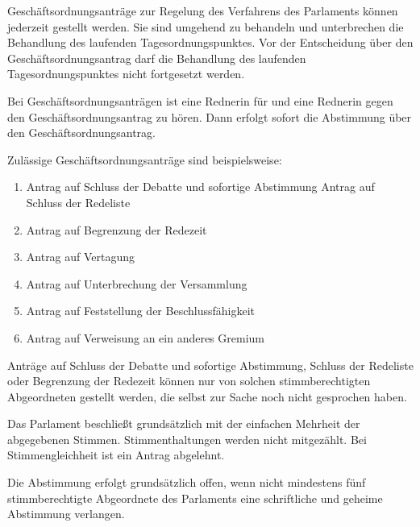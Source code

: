 \documentclass{sasbase}
\begin{document}
\begin{article}[Geschäftsordnungsantr\"{a}ge]
	\item Geschäftsordnungsanträge zur Regelung des Verfahrens des Parlaments können jederzeit gestellt werden. Sie sind umgehend zu behandeln und unterbrechen die Behandlung des laufenden Tagesordnungspunktes. Vor der Entscheidung über den Geschäftsordnungsantrag darf die Behandlung des laufenden Tagesordnungspunktes nicht fortgesetzt werden.
	\item Bei Geschäftsordnungsanträgen ist eine Rednerin  für und eine Rednerin gegen den Geschäftsordnungsantrag zu hören. Dann erfolgt sofort die Abstimmung über den Geschäftsordnungsantrag.
	\item Zulässige Geschäftsordnungsanträge sind beispielsweise:
		\begin{enumerate}
			\item Antrag auf Schluss der Debatte und sofortige Abstimmung   Antrag auf Schluss der Redeliste
			\item Antrag auf Begrenzung der Redezeit
			\item Antrag auf Vertagung
			\item Antrag auf Unterbrechung der Versammlung
			\item Antrag auf Feststellung der Beschlussfähigkeit   
			\item Antrag auf Verweisung an ein anderes Gremium
		\end{enumerate}
	\item Anträge auf Schluss der Debatte und sofortige Abstimmung, Schluss der Redeliste oder Begrenzung der Redezeit können nur von solchen stimmberechtigten Abgeordneten gestellt werden, die selbst zur Sache noch nicht gesprochen haben.
\end{article}
\begin{article}[Abstimmungen]
	\item Das Parlament beschließt grundsätzlich mit der einfachen Mehrheit der abgegebenen Stimmen. Stimmenthaltungen werden nicht mitgezählt. Bei Stimmengleichheit ist ein Antrag abgelehnt.
	\item Die Abstimmung erfolgt grundsätzlich offen, wenn nicht mindestens f\"{u}nf stimmberechtigte Abgeordnete des Parlaments eine schriftliche und geheime Abstimmung verlangen.
\end{article}
\end{document}
